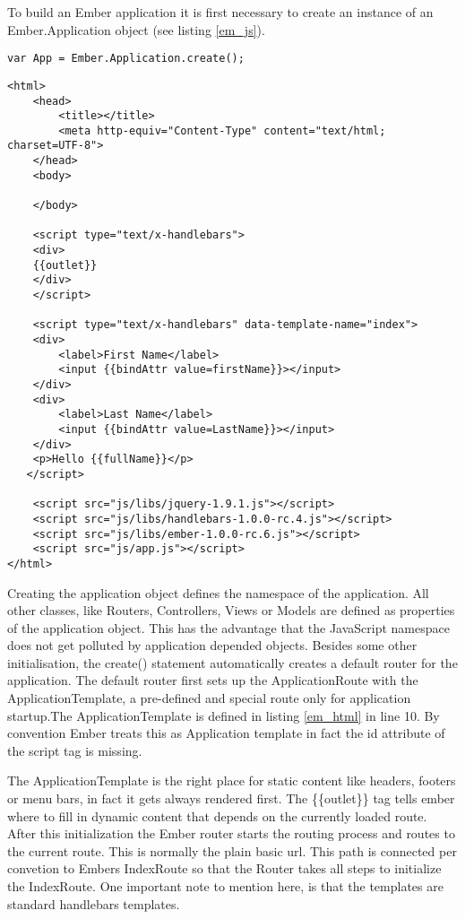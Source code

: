 To build an Ember application it is first necessary to create an instance of an Ember.Application object (see listing \ref{em_js}).
\begin{lstlisting}[label=em_js, caption=app.js]
var App = Ember.Application.create();
\end{lstlisting}

\begin{lstlisting}[label=em_html,caption=index.html]
<html>
    <head>
        <title></title>
        <meta http-equiv="Content-Type" content="text/html; charset=UTF-8">
    </head>
    <body>

    </body>
    
    <script type="text/x-handlebars">
	<div>
	{{outlet}}
	</div>
    </script>

    <script type="text/x-handlebars" data-template-name="index">
	<div>
		<label>First Name</label> 
		<input {{bindAttr value=firstName}}></input>
	</div>
	<div>
		<label>Last Name</label> 
		<input {{bindAttr value=LastName}}></input>
	</div>
	<p>Hello {{fullName}}</p>
   </script>

    <script src="js/libs/jquery-1.9.1.js"></script>
    <script src="js/libs/handlebars-1.0.0-rc.4.js"></script>
    <script src="js/libs/ember-1.0.0-rc.6.js"></script>
    <script src="js/app.js"></script>
</html>
\end{lstlisting}

Creating the application object defines the namespace of the application.
All other classes, like Routers, Controllers, Views or Models are defined as properties of the application object.
This has the advantage that the JavaScript namespace does not get polluted by application depended objects.
Besides some other initialisation, the create() statement automatically creates a default router for the application.
The default router first sets up the ApplicationRoute with the ApplicationTemplate, a pre-defined and special route only for application startup.The ApplicationTemplate is defined in listing \ref{em_html} in line 10.
By convention Ember treats this as Application template in fact the id attribute of the script tag is missing.

The ApplicationTemplate is the right place for static content like headers, footers or menu bars, in fact it gets always rendered first.
The \{\{outlet\}\} tag tells ember where to fill in dynamic content that depends on the currently loaded route.
After this initialization the Ember router starts the routing process and routes to the current route.
This is normally the plain basic url. 
This path is connected per convetion to Embers IndexRoute so that the Router takes all steps to initialize the IndexRoute.
One important note to mention here, is that the templates are standard handlebars templates. 


